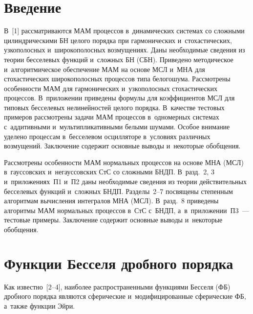  
 \vspace*{12pt}



\thispagestyle{headings}

\begin{multicols}{2}

\label{st\stat}

\section{Введение}


В~[1] рассматриваются МАМ процессов 
в~динамических системах со сложными цилиндрическими БН
целого порядка при гармонических и~стохастических, узкополосных и~широкополосных 
возмущениях. Даны необходимые сведения из теории бесселевых функций и~сложных 
БН (СБН). Приведено методическое и~алгоритмическое обеспечение 
МАМ на основе МСЛ и~МНА для стохастических широкополосных процессов типа белого\linebreak шума. Рассмотрены 
особенности МАМ для гармонических и~узкополосных стохастических процессов. 
В~приложении приведены формулы для коэффициентов МСЛ для типовых бесселевых 
нелинейностей целого порядка. В~качестве тестовых примеров рассмотрены задачи 
МАМ процессов в~одномерных системах с~аддитивными и~мультипликативными белыми 
шумами. Особое внимание уделено процессам в~бесселевом осцилляторе в~условиях 
различных возмущений.  Заключение содержит основные выводы и~некоторые обобщения.

Рассмотрены особенности МАМ нормальных процессов на основе МНА (МСЛ) 
в~гауссовских и~негауссовских СтС со сложными 
БНДП.
В~разд.~2, 3 и~приложениях~П1 и~П2 даны необходимые сведения из теории 
действительных бесселевых функций и~сложных БНДП. Разделы~2--7 посвящены 
степенным алгоритмам вычисления интегралов МНА (МСЛ). В~разд.~8 
приведены алгоритмы МАМ нормальных процессов в~СтС с~БНДП, а~в~приложении~П3~--- 
тестовые примеры. Заключение содержит основные выводы и~некоторые обобщения.


\section{Функции Бесселя дробного порядка}

Как известно~[2--4], наиболее распространенными функциями Бесселя (ФБ) дробного 
порядка являются сферические и~модифицированные сферические ФБ, а~также функции 
Эйри.


\end{multicols}
